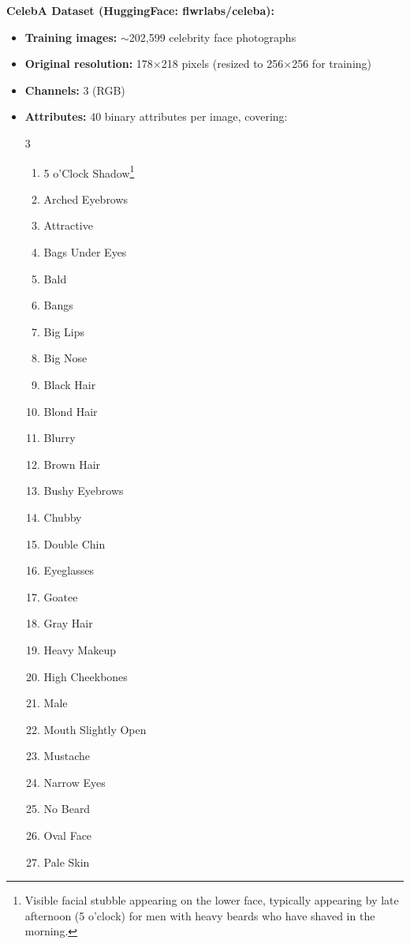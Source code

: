 \textbf{CelebA Dataset (HuggingFace: flwrlabs/celeba):}
\begin{itemize}
    \item \textbf{Training images:} $\sim$202,599 celebrity face photographs
    \item \textbf{Original resolution:} 178$\times$218 pixels (resized to 256$\times$256 for training)
    \item \textbf{Channels:} 3 (RGB)
    \item \textbf{Attributes:} 40 binary attributes per image, covering:
    \begin{multicols}{3}
    \begin{enumerate}
        \item 5 o'Clock Shadow\footnote{Visible facial stubble appearing on the lower face, typically appearing by late afternoon (5 o'clock) for men with heavy beards who have shaved in the morning.}
        \item Arched Eyebrows
        \item Attractive
        \item Bags Under Eyes
        \item Bald
        \item Bangs
        \item Big Lips
        \item Big Nose
        \item Black Hair
        \item Blond Hair
        \item Blurry
        \item Brown Hair
        \item Bushy Eyebrows
        \item Chubby
        \item Double Chin
        \item Eyeglasses
        \item Goatee
        \item Gray Hair
        \item Heavy Makeup
        \item High Cheekbones
        \item Male
        \item Mouth Slightly Open
        \item Mustache
        \item Narrow Eyes
        \item No Beard
        \item Oval Face
        \item Pale Skin

\end{enumerate}
\end{multicols}
\end{itemize}
